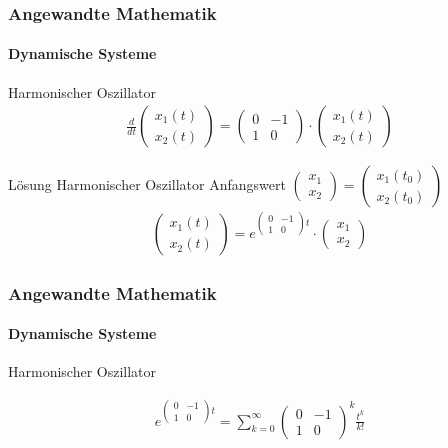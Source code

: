 \documentclass{beamer}
\begin{document}
\begin{frame}
    \frametitle{Angewandte Mathematik}
\framesubtitle{Dynamische Systeme }
\begin{block}{Harmonischer Oszillator}
\begin{align*}
    \frac{d}{dt}\begin{pmatrix}
        x_1(t) \\ x_2(t)
    \end{pmatrix} = 
\begin{pmatrix}
    0 & -1  \\ 1 & 0
\end{pmatrix} \cdot
\begin{pmatrix} 
    x_1(t) \\ x_2(t)
\end{pmatrix} 
\end{align*}
\end{block}

\begin{block}{Lösung Harmonischer Oszillator}
    Anfangswert $\begin{pmatrix}
        x_1 \\ x_2\end{pmatrix} = \begin{pmatrix}
            x_1(t_0) \\ x_2(t_0)\end{pmatrix}$
    \begin{align*}
        \begin{pmatrix}
            x_1(t) \\ x_2(t)
        \end{pmatrix} = e^{ \begin{pmatrix}
            0 & -1  \\ 1 & 0
        \end{pmatrix} t } \cdot \begin{pmatrix}
            x_1\\ x_2
        \end{pmatrix}
    \end{align*}
\end{block}

 \end{frame}


 \begin{frame}
    \frametitle{Angewandte Mathematik}
\framesubtitle{Dynamische Systeme }
\begin{block}{Harmonischer Oszillator}

\begin{align*}
 e^{ \begin{pmatrix}
        0 & -1  \\ 1 & 0
    \end{pmatrix} t } = \sum_{k= 0}^{\infty} \begin{pmatrix}
    0 & -1  \\ 1 & 0
\end{pmatrix}^{k} \frac{t^k}{k!} 
\end{align*}

\end{block}
 \end{frame}
\end{document}
